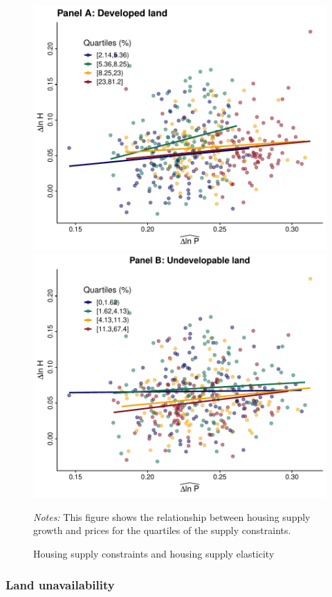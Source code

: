 \documentclass[
  12pt,
]{article}
\begin{document}
\begin{figure}[H]
\centering

\begin{center}\includegraphics[width=0.495\linewidth]{output/figs/supply-constraints-elasticity-1} \includegraphics[width=0.495\linewidth]{output/figs/supply-constraints-elasticity-2} \end{center}

\caption{Housing supply constraints and housing supply elasticity}\label{fig:supply-constraints-elasticity}
\medskip
\begin{minipage}{0.9\textwidth}
\footnotesize
\textit{Notes:} This figure shows the relationship between housing supply growth and prices for the quartiles of the supply constraints. 
\end{minipage}
\end{figure}

\subsubsection*{Land unavailability}\label{land-unavailability}
\end{document}
